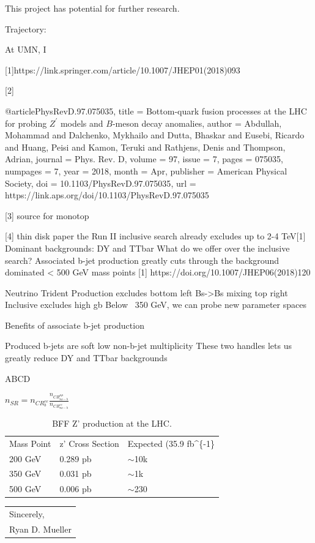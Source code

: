 \documentclass[11pt]{article}
\begin{document}
This project has potential for further research. 


Trajectory:

At UMN, I 

 
 [1]https://link.springer.com/article/10.1007/JHEP01(2018)093
 
 
 [2]

@article{PhysRevD.97.075035,
  title = {Bottom-quark fusion processes at the LHC for probing ${Z}^{\ensuremath{'}}$ models and $B$-meson decay anomalies},
  author = {Abdullah, Mohammad and Dalchenko, Mykhailo and Dutta, Bhaskar and Eusebi, Ricardo and Huang, Peisi and Kamon, Teruki and Rathjens, Denis and Thompson, Adrian},
  journal = {Phys. Rev. D},
  volume = {97},
  issue = {7},
  pages = {075035},
  numpages = {7},
  year = {2018},
  month = {Apr},
  publisher = {American Physical Society},
  doi = {10.1103/PhysRevD.97.075035},
  url = {https://link.aps.org/doi/10.1103/PhysRevD.97.075035}
}

[3] source for monotop


[4] thin disk paper
the Run II inclusive search already excludes up to 2-4 TeV[1]
Dominant backgrounds: DY and TTbar
What do we offer over the inclusive search? 
Associated b-jet production greatly cuts through the background dominated < 500 GeV mass points
[1] https://doi.org/10.1007/JHEP06(2018)120


Neutrino Trident Production excludes bottom left
Bs->Bs mixing top right
Inclusive excludes high gb
Below ~350 GeV, we can probe new parameter spaces

Benefits of associate b-jet production

Produced b-jets are soft
low non-b-jet multiplicity
These two handles lets us greatly reduce DY and TTbar backgrounds

ABCD

$n_{SR}=n_{CR_{b}^{ee}}\frac{n_{CR_{no-b}^{\mu\mu}}}{n_{CR_{no-b}^{ee}}}$


\begin{table}[]
\begin{tabular}{lll}
Mass Point & z' Cross Section & Expected (35.9 fb\textasciicircum{}\{-1\} \\
200 GeV    & 0.289 pb         & $\sim$10k                                \\
350 GeV    & 0.031 pb         & $\sim$1k                                 \\
500 GeV    & 0.006 pb         & $\sim$230                                
\end{tabular}
\caption{BFF Z' production at the LHC.}
\end{table}



\bigskip

\begin{tabular}{@{}l@{}}
Sincerely, \\
  [.4em]
  [.2em]
  Ryan D. Mueller
\end{tabular}
\end{document}
